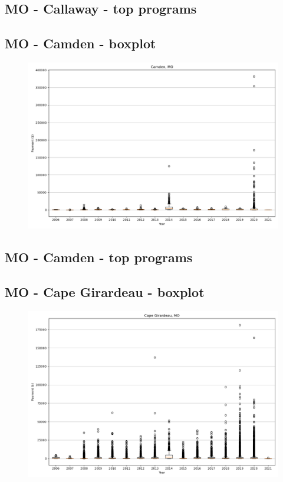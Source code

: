 \subsection*{MO - Callaway - top programs}

\newpage
\subsection*{MO - Camden - boxplot}
\begin{figure}[h]
\centering
\includegraphics[width=7in]{../output/boxplots/counties/Camden-MO_boxplot.png}
\end{figure}


\subsection*{MO - Camden - top programs}

\newpage
\subsection*{MO - Cape Girardeau - boxplot}
\begin{figure}[h]
\centering
\includegraphics[width=7in]{../output/boxplots/counties/Cape Girardeau-MO_boxplot.png}
\end{figure}


